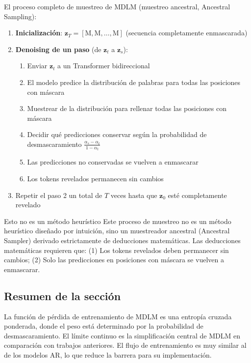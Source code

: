\documentclass[a4paper]{article}
\begin{document}
El proceso completo de muestreo de MDLM (muestreo ancestral, Ancestral Sampling):

\begin{enumerate}
    \item \textbf{Inicialización}: $\mathbf{z}_T = [\text{M}, \text{M}, \ldots, \text{M}]$ (secuencia completamente enmascarada)
    \item \textbf{Denoising de un paso} (de $\mathbf{z}_t$ a $\mathbf{z}_s$):
    \begin{enumerate}
        \item Enviar $\mathbf{z}_t$ a un Transformer bidireccional
        \item El modelo predice la distribución de palabras para todas las posiciones con máscara
        \item Muestrear de la distribución para rellenar todas las posiciones con máscara
        \item Decidir qué predicciones conservar según la probabilidad de desmascaramiento $\frac{\alpha_s - \alpha_t}{1 - \alpha_t}$
        \item Las predicciones no conservadas se vuelven a enmascarar
        \item Los tokens revelados permanecen sin cambios
    \end{enumerate}
    \item Repetir el paso 2 un total de $T$ veces hasta que $\mathbf{z}_0$ esté completamente revelado
\end{enumerate}

\begin{warningbox}{Esto no es un método heurístico}
Este proceso de muestreo no es un método heurístico diseñado por intuición, sino un muestreador ancestral (Ancestral Sampler) derivado estrictamente de deducciones matemáticas. Las deducciones matemáticas requieren que: (1) Los tokens revelados deben permanecer sin cambios; (2) Solo las predicciones en posiciones con máscara se vuelven a enmascarar.
\end{warningbox}

\subsection{Resumen de la sección}

La función de pérdida de entrenamiento de MDLM es una entropía cruzada ponderada, donde el peso está determinado por la probabilidad de desmascaramiento. El límite continuo es la simplificación central de MDLM en comparación con trabajos anteriores. El flujo de entrenamiento es muy similar al de los modelos AR, lo que reduce la barrera para su implementación.
\end{document}
